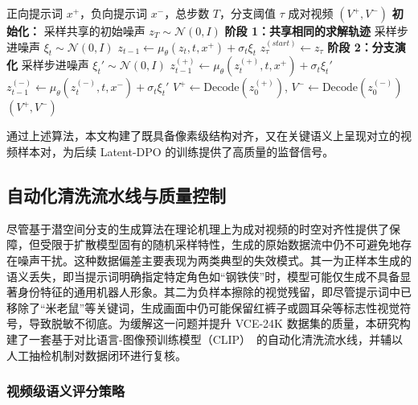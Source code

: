 \begin{algorithm}[H]
\label{alg:branching}
\begin{algorithmic}[1]
\Require 正向提示词 $x^+$，负向提示词 $x^-$，总步数 $T$，分支阈值 $\tau$
\Ensure 成对视频 $(V^+, V^-)$
\State \textbf{初始化：} 采样共享的初始噪声 $z_T \sim \mathcal{N}(0, I)$
\State \textbf{阶段 1：共享相同的求解轨迹}
    \State 采样步进噪声 $\xi_t \sim \mathcal{N}(0, I)$
    \State $z_{t-1} \leftarrow \mu_\theta(z_t, t, x^+) + \sigma_t \xi_t$ 
\EndFor
\State $z_{\tau}^{(start)} \leftarrow z_{\tau}$ 
\State \textbf{阶段 2：分支演化}
    \State 采样步进噪声 $\xi_t' \sim \mathcal{N}(0, I)$
    \State $z_{t-1}^{(+)} \leftarrow \mu_\theta(z_t^{(+)}, t, x^+) + \sigma_t \xi_t'$ 
    \State $z_{t-1}^{(-)} \leftarrow \mu_\theta(z_t^{(-)}, t, x^-) + \sigma_t \xi_t'$ 
\EndFor
\State $V^+ \leftarrow \text{Decode}(z_0^{(+)})$, $V^- \leftarrow \text{Decode}(z_0^{(-)})$
\Return $(V^+, V^-)$
\end{algorithmic}
\end{algorithm}

通过上述算法，本文构建了既具备像素级结构对齐，又在关键语义上呈现对立的视频样本对，为后续 Latent-DPO 的训练提供了高质量的监督信号。

\subsection{自动化清洗流水线与质量控制}

尽管基于潜空间分支的生成算法在理论机理上为成对视频的时空对齐性提供了保障，但受限于扩散模型固有的随机采样特性，生成的原始数据流中仍不可避免地存在噪声干扰。这种数据偏差主要表现为两类典型的失效模式。其一为正样本生成的语义丢失，即当提示词明确指定特定角色如“钢铁侠”时，模型可能仅生成不具备显著身份特征的通用机器人形象。其二为负样本擦除的视觉残留，即尽管提示词中已移除了“米老鼠”等关键词，生成画面中仍可能保留红裤子或圆耳朵等标志性视觉符号，导致脱敏不彻底。为缓解这一问题并提升 VCE-24K 数据集的质量，本研究构建了一套基于对比语言-图像预训练模型（CLIP）~\cite{Radford2021LearningTV}的自动化清洗流水线，并辅以人工抽检机制对数据闭环进行复核。

\subsubsection{视频级语义评分策略}

